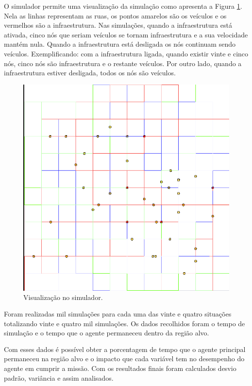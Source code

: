 O simulador permite uma visualização da simulação como apresenta a Figura \ref{fig:visulizacaoSimulador}. Nela as linhas representam as ruas, os pontos amarelos são os veículos e os vermelhos são a infraestrutura. Nas simulações, quando a infraestrutura está ativada, cinco nós que seriam veículos se tornam infraestrutura e a sua velocidade mantém nula. Quando a infraestrutura está desligada os nós continuam sendo veículos. Exemplificando: com a infraestrutura ligada, quando existir vinte e cinco nós, cinco nós são infraestrutura e o restante veículos. Por outro lado, quando a infraestrutura estiver desligada, todos os nós são veículos.

\begin{figure}[htbp]
	\centering
	\includegraphics[scale=0.4]{metodologia/figuras/simulacaoGrubix.png}
	\caption{Visualização no simulador.}
	\label{fig:visulizacaoSimulador}
\end{figure}

Foram realizadas mil simulações para cada uma das vinte e quatro situações totalizando vinte e quatro mil simulações. Os dados recolhidos foram o tempo de simulação e o tempo que o agente permaneceu dentro da região alvo.  

Com esses dados é possível obter a porcentagem de tempo que o agente principal permaneceu na região alvo e o impacto que cada variável tem no desempenho do agente em cumprir a missão. Com os resultados finais foram calculados desvio padrão, variância e assim analisados.
